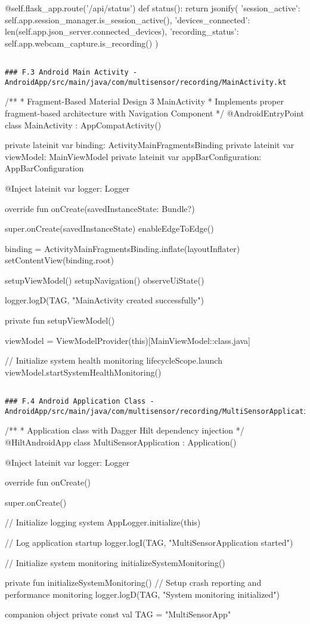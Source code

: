 \documentclass[12pt,a4paper]{report}
\begin{document}
        @self.flask\_app.route('/api/status')
        def status():
            return jsonify({
                'session\_active': self.app.session\_manager.is\_session\_active(),
                'devices\_connected': len(self.app.json\_server.connected\_devices),
                'recording\_status': self.app.webcam\_capture.is\_recording()
            })
\begin{verbatim}

### F.3 Android Main Activity - AndroidApp/src/main/java/com/multisensor/recording/MainActivity.kt

\end{verbatim}
/**
 * Fragment-Based Material Design 3 MainActivity
 * Implements proper fragment-based architecture with Navigation Component
 */
@AndroidEntryPoint
class MainActivity : AppCompatActivity() {

    private lateinit var binding: ActivityMainFragmentsBinding
    private lateinit var viewModel: MainViewModel
    private lateinit var appBarConfiguration: AppBarConfiguration

    @Inject
    lateinit var logger: Logger

    override fun onCreate(savedInstanceState: Bundle?) {
        super.onCreate(savedInstanceState)
        enableEdgeToEdge()

        binding = ActivityMainFragmentsBinding.inflate(layoutInflater)
        setContentView(binding.root)

        setupViewModel()
        setupNavigation()
        observeUiState()

        logger.logD(TAG, "MainActivity created successfully")
    }

    private fun setupViewModel() {
        viewModel = ViewModelProvider(this)[MainViewModel::class.java]

        // Initialize system health monitoring
        lifecycleScope.launch {
            viewModel.startSystemHealthMonitoring()
        }
    }
}
\begin{verbatim}

### F.4 Android Application Class - AndroidApp/src/main/java/com/multisensor/recording/MultiSensorApplication.kt

\end{verbatim}
/**
 * Application class with Dagger Hilt dependency injection
 */
@HiltAndroidApp
class MultiSensorApplication : Application() {

    @Inject
    lateinit var logger: Logger

    override fun onCreate() {
        super.onCreate()

        // Initialize logging system
        AppLogger.initialize(this)

        // Log application startup
        logger.logI(TAG, "MultiSensorApplication started")

        // Initialize system monitoring
        initializeSystemMonitoring()
    }

    private fun initializeSystemMonitoring() {
        // Setup crash reporting and performance monitoring
        logger.logD(TAG, "System monitoring initialized")
    }

    companion object {
        private const val TAG = "MultiSensorApp"
    }
}
\end{document}
